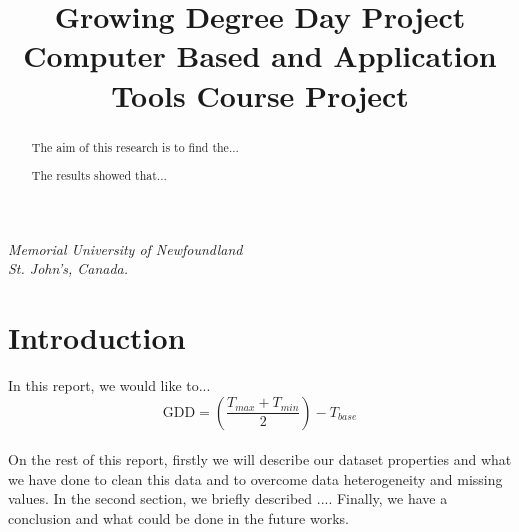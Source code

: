 \documentclass[12pt,letterpaper]{article}
\begin{document}
{\centering
\title{Growing Degree Day Project \\ \vspace{.5 cm} {\Large Computer Based and Application Tools Course Project} }
\maketitle

{\itshape Memorial University of Newfoundland \\ St. John's, Canada.\par}
}
\begin{abstract}
The aim of this research is to find the...

The results showed that...
\end{abstract}

\section{Introduction}

In this report, we would like to...
\\
\begin{equation}
\textrm{GDD} = \left(\frac{T_{max} + T_{min}}{2}\right) - T_{base}
\label{eqn:gdd}
\end{equation}
\\
On the rest of this report, firstly we will describe our dataset properties and what we have done to clean this data and to overcome data heterogeneity and missing values. In the second section, we briefly described ....
Finally, we have a conclusion and what could be done in the future works.
\end{document}
